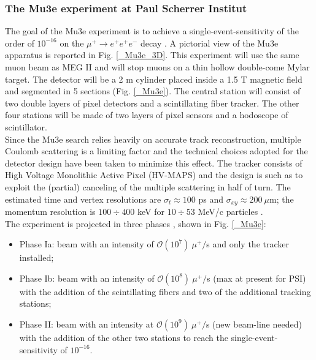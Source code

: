\documentclass[12pt,a4paper,openright, oneside, titlepage]{book} %
\begin{document}
\subsubsection{The Mu3e experiment at Paul Scherrer Institut}
The goal of the Mu3e experiment is to achieve a single-event-sensitivity of  the order of $10^{-16}$ on the $\mu^+ \rightarrow e^+ e^+e^-$ decay \cite{Mu3e:2016}. 
A pictorial view of the Mu3e apparatus is reported in Fig. \ref{_Mu3e_3D}.  
This experiment will use the same muon beam as MEG II and will stop muons on a thin hollow double-come Mylar target. 
The detector will be a 2 m cylinder placed inside a 1.5 T magnetic field and segmented in 5 sections (Fig. \ref{_Mu3e}). 
The central station will consist of two double layers of pixel detectors and a scintillating fiber tracker. 
The other four stations will be made of two layers of pixel sensors and a hodoscope of scintillator. \\
Since the Mu3e search relies heavily on accurate track reconstruction, multiple Coulomb scattering is a limiting factor and the technical choices adopted for the detector design have been taken to minimize this effect. 
The tracker consists of High Voltage Monolithic Active Pixel (HV-MAPS) and the design is such as to exploit the (partial) canceling of the multiple scattering in half of turn. 
The estimated time and vertex resolutions are $\sigma_t\approx 100$ ps  and $\sigma_{xy}\approx 200\ \mu$m; the momentum resolution is $100\div400$ keV for $10\div53$ MeV/c particles \cite{Papa}\cite{Signorelli}.\\
The experiment is projected in three phases  \cite{Signorelli}, shown in Fig. \ref{_Mu3e}:
\begin{itemize}
\item Phase Ia: beam with an intensity of $\mathcal{O}(10^7)\ \mu^+/$s and only the tracker installed;
\item Phase Ib: beam with an intensity of $\mathcal{O}(10^8)\ \mu^+/$s (max at present for PSI) 
with the addition of the scintillating fibers and two of the additional tracking stations;
\item Phase II: beam with an intensity at $\mathcal{O}(10^9)\ \mu^+/$s (new beam-line needed) 
with the addition of the other two stations to reach the single-event-sensitivity of $10^{-16}$.
\end{itemize}
\end{document}
